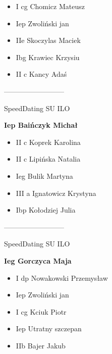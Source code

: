 \documentclass[a4paper,10pt]{article}
\begin{document}
\begin{multicols}{3}
\begin{minipage}[l]{\textwidth}
  \begin{itemize}
    \item I cg Chomicz Mateusz
    \item Iep Zwoliński jan
    \item IIe Skoczylas Maciek
    \item Ibg Krawiec Krzysiu
    \item II c Kancy Adaś

    \end{itemize}



\end{minipage}



\begin{minipage}[l]{\textwidth}
--------------------------

  \footnotesize{SpeedDating SU ILO}

  \bfseries{Iep Baińczyk Michał}

  \begin{itemize}
    \item II c Koprek Karolina
    \item II c Lipińska Natalia
    \item Ieg Bulik Martyna
    \item III a Ignatowicz Krystyna
    \item Ibp Kołodziej Julia

    \end{itemize}



\end{minipage}



\begin{minipage}[l]{\textwidth}
--------------------------

  \footnotesize{SpeedDating SU ILO}

  \bfseries{Ieg Gorczyca Maja}

  \begin{itemize}
    \item I dp Nowakowski Przemysław
    \item Iep Zwoliński jan
    \item I cg Kciuk Piotr
    \item Iep Utratny szczepan
    \item IIb Bajer Jakub

    \end{itemize}




\end{minipage}
\end{multicols}
\end{document}
